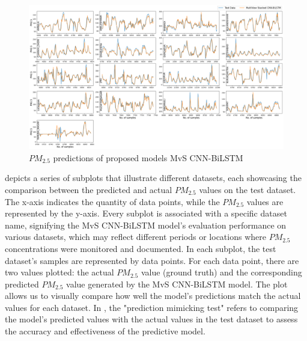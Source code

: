 \documentclass[a4paper, fleqn]{cas-sc}
\theoremstyle{definition}
\theoremstyle{remark}
\begin{document}
\begin{figure}[h!]
	\centering
		\includegraphics[scale=0.29]{act vs pri}
	  \caption{$PM_{2.5}$ predictions of proposed models MvS CNN-BiLSTM}\label{ACt_vs_Pred}
\end{figure}
 depicts a series of subplots that illustrate different datasets,  each showcasing the comparison between the predicted and actual $PM_{2.5}$ values on the test dataset. The x-axis indicates the quantity of data points,  while the $PM_{2.5}$ values are represented by the y-axis. Every subplot is associated with a specific dataset name,  signifying the MvS CNN-BiLSTM model's evaluation performance on various datasets,  which may reflect different periods or locations where $PM_{2.5}$ concentrations were monitored and documented. In each subplot,  the test dataset's samples are represented by data points. For each data point,  there are two values plotted:  the actual $PM_{2.5}$ value (ground truth) and the corresponding predicted $PM_{2.5}$ value generated by the MvS CNN-BiLSTM model. The plot allows us to visually compare how well the model's predictions match the actual values for each dataset. In , the "prediction mimicking test" refers to comparing the model's predicted values with the actual values in the test dataset to assess the accuracy and effectiveness of the predictive model.
\end{document}
